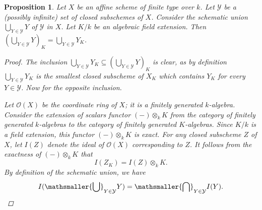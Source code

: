 \documentclass[twoside,a4paper,reqno,11pt]{amsart}
\DeclareMathOperator{\Spec}{Spec}
\newtheorem{proposition}[theorem]{Proposition}
\theoremstyle{definition}
\begin{document}
\begin{proposition}\label{schunionbasechange} Let $X$ be an affine scheme of finite type over $k$. Let $\mathcal{Y}$ be a (possibly infinite) set of closed subschemes of $X$. Consider the schematic union $\bigcup_{Y\in\mathcal{Y}}Y$ of $\mathcal{Y}$ in $X$. Let $K/k$ be an algebraic field extension. Then $(\bigcup_{Y\in\mathcal{Y}}Y)_K=\bigcup_{Y\in\mathcal{Y}}Y_K$. %
\begin{proof} The inclusion $\bigcup_{Y\in\mathcal{Y}}Y_K\subseteq(\bigcup_{Y\in\mathcal{Y}}Y)_K$ is clear, as by definition $\bigcup_{Y\in\mathcal{Y}}Y_K$ is the smallest closed subscheme of $X_K$ which contains $Y_K$ for every $Y\in\mathcal{Y}$. Now for the opposite inclusion.

\vspace{2mm}\noindent Let $\mathcal{O}(X)$ be the coordinate ring of $X$; it is a finitely generated $k$-algebra. Consider the extension of scalars functor $(-)\otimes_k K$ from the category of finitely generated $k$-algebras to the category of finitely generated $K$-algebras. Since $K/k$ is a field extension, this functor $(-)\otimes_k K$ is exact. %
For any closed subscheme $Z$ of $X$, let $I(Z)$ denote the ideal of $\mathcal{O}(X)$ corresponding to $Z$. It follows from the exactness of $(-)\otimes_k K$ that \begin{equation}\label{compat} I(Z_K)=I(Z)\otimes_k K.\end{equation} %
By definition of the schematic union, we have \begin{equation}\label{defschunion} I(\mathsmaller{\bigcup}_{Y\in\mathcal{Y}}Y)=\mathsmaller{\bigcap}_{Y\in\mathcal{Y}}I(Y).\end{equation}


\end{proof}
\end{proposition}
\end{document}
